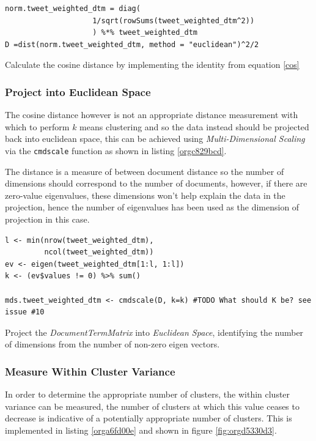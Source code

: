 \documentclass[11pt]{article}
\begin{document}
\begin{listing}[htbp]
\begin{verbatim}
norm.tweet_weighted_dtm = diag(
                    1/sqrt(rowSums(tweet_weighted_dtm^2))
                    ) %*% tweet_weighted_dtm
D =dist(norm.tweet_weighted_dtm, method = "euclidean")^2/2
\end{verbatim}
\caption{\label{org3e5645a}Calculate the cosine distance by implementing the identity from equation \eqref{cos}}
\end{listing}

\subsubsection{Project into Euclidean Space}
\label{sec:org35dd88a}
The cosine distance however is not an appropriate distance measurement with
which to perform \(k\) means clustering and so the data instead should be
projected back into euclidean space, this can be achieved using
\emph{Multi-Dimensional Scaling} via the \texttt{cmdscale} function as shown in listing \ref{orgc829bcd}.

The distance is a measure of between document distance so the number of
dimensions should correspond to the number of documents, however, if there are
zero-value eigenvalues, these dimensions won't help explain the data in the
projection, hence the number of eigenvalues has been used as the dimension of
projection in this case.

\begin{listing}[htbp]
\begin{verbatim}
l <- min(nrow(tweet_weighted_dtm),
         ncol(tweet_weighted_dtm))
ev <- eigen(tweet_weighted_dtm[1:l, 1:l])
k <- (ev$values != 0) %>% sum()

mds.tweet_weighted_dtm <- cmdscale(D, k=k) #TODO What should K be? see issue #10
\end{verbatim}
\caption{\label{orgc829bcd}Project the \emph{DocumentTermMatrix} into \emph{Euclidean Space}, identifying the number of dimensions from the number of non-zero eigen vectors.}
\end{listing}

\subsubsection{Measure Within Cluster Variance}
\label{sec:org9971f94}
In order to determine the appropriate number of clusters, the within cluster
variance can be measured, the number of clusters at which this value ceases to
decrease is indicative of a potentially appropriate number of clusters. This is
implemented in listing \ref{orga6fd00e} and shown in figure \ref{fig:orgd5330d3}.
\end{document}
